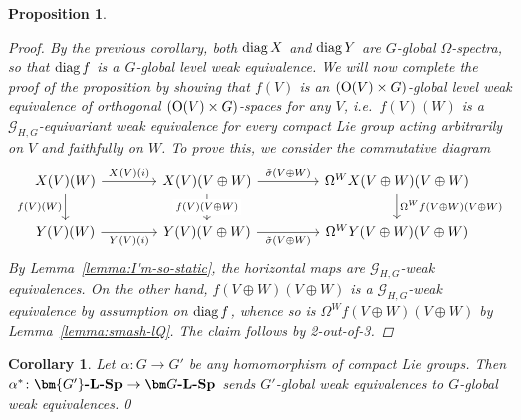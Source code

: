 \documentclass[reqno]{memo-l}
\theoremstyle{mythm}
\newtheorem{cor}[thm]{Corollary}
\newtheorem{prop}[thm]{Proposition}
\theoremstyle{definition}
\numberwithin{equation}{section}
\newcommand{\cat}[1]{\textbf{\textup{#1}}}
\renewcommand{\O}{{\textup{O}}}
\newcommand{\diag}{\textup{diag}}
\begin{document}
\begin{prop}
\begin{proof}
        By the previous corollary, both $\diag\,X$ and $\diag\,Y$ are $G$-global $\Omega$-spectra, so that $\diag\,f$ is a $G$-global \emph{level} weak equivalence. We will now complete the proof of the proposition by showing that $f(V)$ is an $(\O(V)\times G)$-global \emph{level} weak equivalence of orthogonal $(\O(V)\times G)$-spaces for any $V$, i.e.\ $f(V)(W)$ is a $\mathcal G_{H,G}$-equivariant weak equivalence for every compact Lie group acting arbitrarily on $V$ and faithfully on $W$. To prove this, we consider the commutative diagram
        \[
            \begin{tikzcd}
                X(V)(W)\arrow[d,"f(V)(W)"']\arrow[r,"X(V)(i)"] &[1.5em] X(V)(V\oplus W)\arrow[d,"f(V)(V\oplus W)"{description}]\arrow[r,"\tilde\sigma(V\oplus W)"]&[2em]\Omega^WX(V\oplus W)(V\oplus W)\arrow[d,"\Omega^Wf(V\oplus W)(V\oplus W)"]\\
                Y(V)(W)\arrow[r,"Y(V)(i)"'] & Y(V)(V\oplus W)\arrow[r,"\tilde\sigma(V\oplus W)"'] & \Omega^WY(V\oplus W)(V\oplus W)
            \end{tikzcd}
        \]
        By Lemma~\ref{lemma:I'm-so-static}, the horizontal maps are $\mathcal G_{H,G}$-weak equivalences. On the other hand, $f(V\oplus W)(V\oplus W)$ is a $\mathcal G_{H,G}$-weak equivalence by assumption on $\diag\,f$, whence so is $\Omega^Wf(V\oplus W)(V\oplus W)$ by Lemma~\ref{lemma:smash-lQ}. The claim follows by 2-out-of-3.
    \end{proof}
\end{prop}

\begin{cor}\label{cor:LSp-restr-homotopical}
    Let $\alpha\colon G\to G'$ be any homomorphism of compact Lie groups. Then $\alpha^*\colon\cat{$\bm{G'}$-$\cat{L}$-Sp}\to\cat{$\bm G$-$\cat{L}$-Sp}$ sends $G'$-global weak equivalences to $G$-global weak equivalences.\qed
\end{cor}
\end{document}
